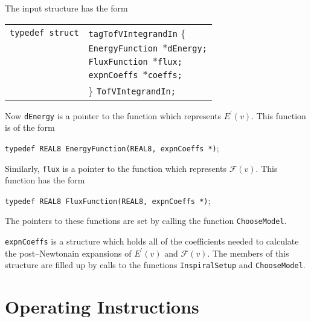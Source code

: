 \documentclass[12pt]{article}
\begin{document}
The input structure has the form

\vspace{5mm}

\begin{tabular}{ll}
\texttt{typedef struct} & \texttt{tagTofVIntegrandIn} \{ \\
                        & \texttt{EnergyFunction $\ast$dEnergy;}  \\
                        & \texttt{FluxFunction $\ast$flux;}  \\
                        & \texttt{expnCoeffs $\ast$coeffs;}  \\
                        & \} \texttt{TofVIntegrandIn;}
\end{tabular}

\vspace{5mm}


Now \texttt{dEnergy} is a pointer to the function which represents $E^{\prime}(v)$. This function is of the form

\vspace{5mm}

\texttt{typedef REAL8 EnergyFunction(REAL8, expnCoeffs *)};

\vspace{5mm}

Similarly, \texttt{flux} is a pointer to the function which represents $\mathcal{F}(v)$. This function has the form

\vspace{5mm}

\texttt{typedef REAL8 FluxFunction(REAL8, expnCoeffs *)};

\vspace{5mm}

The pointers to these functions are set by calling the function \texttt{ChooseModel}.

\texttt{expnCoeffs} is a structure which holds all of the coefficients needed to calculate the post--Newtonain expansions of $E^{\prime}(v)$ and $\mathcal{F}(v)$. The members of this structure are filled up by calls to the functions \texttt{InspiralSetup} and \texttt{ChooseModel}.









\section{Operating Instructions}
\end{document}
